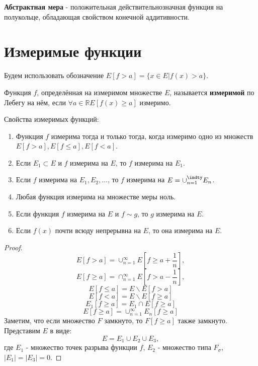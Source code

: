 \documentclass[11pt]{article}
\def\zall{\setcounter{lem}{0}\setcounter{cnsqnc}{0}\setcounter{th}{0}\setcounter{Cmt}{0}\setcounter{equation}{0}\setcounter{stnmt}{0}}
\newcounter{lem}\setcounter{lem}{0}
\newcounter{stnmt}\setcounter{stnmt}{0}
\def\st{\par\smallskip\refstepcounter{stnmt}\textbf{\arabic{stnmt}}}
\newtheorem*{Statement}{Утверждение \st}
\newcounter{th}\setcounter{th}{0}
\newcounter{cnsqnc}\setcounter{cnsqnc}{0}
\newcounter{Cmt}\setcounter{Cmt}{0}
\begin{document}
\textbf{Абстрактная мера} - положительная действительнозначная функция на полукольце,
обладающая свойством конечной аддитивности.
\section{Измеримые функции}
\label{sec:org7e9d788}
\zall
Будем использовать обозначение \(E[f > a] = \{x \in E | f(x) > a\}\).

Функция \(f\), определённая на измеримом множестве \(E\), называется \textbf{измеримой} по Лебегу на нём, если
\(\forall a \in \mathbb{R} E[f(x) \geq a]\) измеримо.

Свойства измеримых функций:
\begin{Statement}
\begin{enumerate}
\item Функция $f$ измерима тогда и только тогда, когда измеримо одно из множеств $E[f > a], E[f \leq a], E[f < a]$.
\item Если $E_1 \subset E$ и $f$ измерима на $E$, то $f$ измерима на $E_1$.
\item Если $f$ измерима на $E_1, E_2, \ldots$, то $f$ измерима на $E = \cup_{n = 1}^{\indty}E_n$.
\item Любая функция измерима на множестве меры ноль.
\item Если функция $f$ измерима на $E$ и $f \sim g$, то $g$ измерима на $E$.
\item Если $f(x)$ почти всюду непрерывна на $E$, то она измерима на $E$.
\end{enumerate}
\end{Statement}
\begin{proof}
\begin{equation}
E[f > a] = \cup_{n = 1}^{\infty}E[f \geq a + \frac1n],
\end{equation}
\begin{equation}
E[f \geq a] = \cap_{n = 1}^{\infty}E[f > a - \frac1n],
\end{equation}
\begin{equation}
E[f \leq a] = E \backslash E[f > a]
\end{equation}
\begin{equation}
E[f < a] = E \backslash E[f \geq a]
\end{equation}
\begin{equation}
E_1[f \geq a] = E_1 \cap E[f \geq a]
\end{equation}
\begin{equation}
E[f \geq a] = \cup_{n = 1}^{\infty}E_n[f \geq a]
\end{equation}
Заметим, что если множество $F$ замкнуто, то $F[f \geq a]$ также замкнуто. Представим $E$ в
виде:
\begin{equation}
E = E_1 \cup E_2 \cup E_3,
\end{equation}
где $E_1$ - множество точек разрыва функции $f$, $E_2$ - множество типа $F_{\sigma}$, $|E_1| = |E_3| = 0$.
\end{proof}
\end{document}

